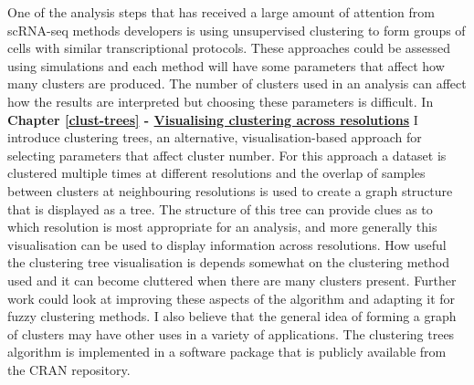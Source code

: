\documentclass[11pt,a4paper,titlepage,twoside,openright]{style/unimelbthesis}
\theoremstyle{definition}
\theoremstyle{definition}
\theoremstyle{definition}
\theoremstyle{remark}
\begin{document}
\begin{mainmatter}
One of the analysis steps that has received a large amount of attention from scRNA-seq methods developers is using unsupervised clustering to form groups of cells with similar transcriptional protocols. These approaches could be assessed using simulations and each method will have some parameters that affect how many clusters are produced. The number of clusters used in an analysis can affect how the results are interpreted but choosing these parameters is difficult. In \textbf{Chapter \ref{clust-trees} - \protect\hyperlink{clust-trees}{Visualising clustering across resolutions}} I introduce clustering trees, an alternative, visualisation-based approach for selecting parameters that affect cluster number. For this approach a dataset is clustered multiple times at different resolutions and the overlap of samples between clusters at neighbouring resolutions is used to create a graph structure that is displayed as a tree. The structure of this tree can provide clues as to which resolution is most appropriate for an analysis, and more generally this visualisation can be used to display information across resolutions. How useful the clustering tree visualisation is depends somewhat on the clustering method used and it can become cluttered when there are many clusters present. Further work could look at improving these aspects of the algorithm and adapting it for fuzzy clustering methods. I also believe that the general idea of forming a graph of clusters may have other uses in a variety of applications. The clustering trees algorithm is implemented in a software package that is publicly available from the CRAN repository.


\end{mainmatter}
\end{document}
